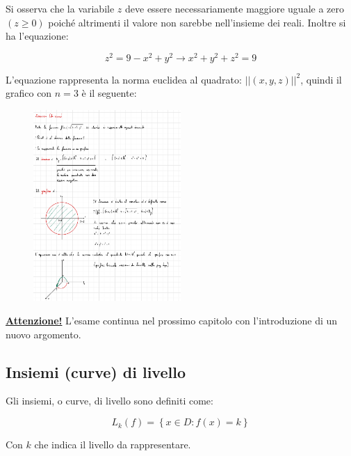 \documentclass[a4paper]{article}
\begin{document}
	\noindent
	Si osserva che la variabile $z$ deve essere necessariamente maggiore uguale a zero $\left(z \ge 0\right)$ poiché altrimenti il valore non sarebbe nell'insieme dei reali. Inoltre si ha l'equazione:
	
	\begin{equation*}
		z^{2} = 9 - x^{2} + y^{2} \longrightarrow x^{2} + y^{2} + z^{2} = 9
	\end{equation*}

	\noindent
	L'equazione rappresenta la norma euclidea al quadrato: $\Big||\left(x,y,z\right)|\Big|^{2}$, quindi il grafico con $n = 3$ è il seguente:
	
	\begin{figure}[!htp]
		\centering
		\includegraphics[width=0.5\textwidth]{img/grafico2_esame1.pdf}
	\end{figure}

	\noindent
	\textbf{\underline{Attenzione!}} L'esame continua nel prossimo capitolo con l'introduzione di un nuovo argomento.

	\newpage
	
	\subsection{Insiemi (curve) di livello}
	
	Gli insiemi, o curve, di livello sono definiti come:
	
	\begin{equation*}
		L_{k}\left(f\right) = \left\{x \in D : f\left(x\right) = k\right\}
	\end{equation*}

	\noindent
	Con $k$ che indica il livello da rappresentare.
	
\end{document}
